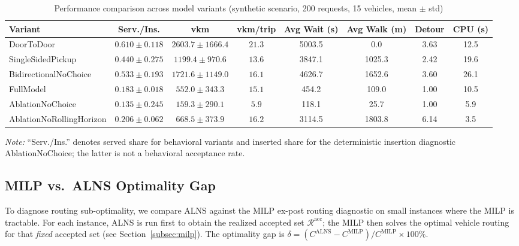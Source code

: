 \begin{table}[h]
\centering
\caption{Performance comparison across model variants (synthetic scenario, 200 requests, 15 vehicles, mean $\pm$ std)}
\label{tab:main-results}
\begin{tabular}{lccccccc}
\toprule
Variant & Serv./Ins. & vkm & vkm/trip & Avg Wait (s) & Avg Walk (m) & Detour & CPU (s) \\
\midrule
DoorToDoor               & $0.610 \pm 0.118$ & $2603.7 \pm 1666.4$ & $21.3$ & 5003.5 & 0.0    & 3.63 & 12.5 \\
SingleSidedPickup        & $0.440 \pm 0.275$ & $1199.4 \pm 970.6$  & $13.6$ & 3847.1 & 1025.3 & 2.42 & 19.6 \\
BidirectionalNoChoice    & $0.533 \pm 0.193$ & $1721.6 \pm 1149.0$ & $16.1$ & 4626.7 & 1652.6 & 3.60 & 26.1 \\
FullModel                & $0.183 \pm 0.018$ & $552.0 \pm 343.3$   & $15.1$ & 454.2  & 109.0  & 1.00 & 10.5 \\
AblationNoChoice         & $0.135 \pm 0.245$ & $159.3 \pm 290.1$   & $5.9$  & 118.1  & 25.7   & 1.00 & 5.9  \\
AblationNoRollingHorizon & $0.206 \pm 0.062$ & $668.5 \pm 373.9$   & $16.2$ & 3114.5 & 1803.8 & 6.14 & 3.5  \\
\bottomrule
\end{tabular}
\footnotesize
\emph{Note:} ``Serv./Ins.'' denotes served share for behavioral variants and
inserted share for the deterministic insertion diagnostic AblationNoChoice; the
latter is not a behavioral acceptance rate.
\end{table}

\subsection{MILP vs.\ ALNS Optimality Gap}\label{subsec:milp-gap}

To diagnose routing sub-optimality, we compare ALNS against the MILP ex-post
routing diagnostic on small instances where the MILP is tractable.
For each instance, ALNS is run first to obtain the realized accepted set
$\mathcal{R}^{\text{acc}}$; the MILP then solves the optimal vehicle routing
for that \emph{fixed} accepted set (see Section~\ref{subsec:milp}).
The optimality gap is $\delta = (C^{\text{ALNS}} - C^{\text{MILP}}) /
C^{\text{MILP}} \times 100\%$.

